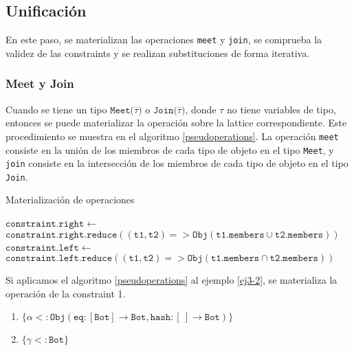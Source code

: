 \subsection{Unificación}
En este paso, se materializan las operaciones \texttt{meet} y \texttt{join}, se comprueba la validez de las constraints y se realizan substituciones de forma iterativa.

\subsubsection{Meet y Join}
Cuando se tiene un tipo $\mathtt{Meet(\overline{\tau}})$ o $\mathtt{Join(\overline{\tau}})$, donde $\tau$ no tiene variables de tipo, entonces se puede materializar la operación sobre la lattice correspondiente. Este procedimiento se muestra en el algoritmo \ref{pseudoperations}. La operación \texttt{meet} consiste en la unión de los miembros de cada tipo de objeto en el tipo \texttt{Meet}, y \texttt{join} consiste en la intersección de los miembros de cada tipo de objeto en el tipo \texttt{Join}.

\begin{algorithm}\captionsetup{labelsep=newline}
  \centering
  \caption{Materialización de operaciones}
  \label{pseudoperations}
    \begin{algorithmic}[1]
              \State $\mathtt{constraint.right\gets}$
              \State \ \ \ \ \ \ \ \ \ $\mathtt{constraint.right.reduce((t1,t2) => Obj(t1.members \cup t2.members))}$
            \EndIf
              \State $\mathtt{constraint.left\gets}$
              \State \ \ \ \ \ \ \ \ \ $\mathtt{constraint.left.reduce((t1,t2) => Obj(t1.members \cap t2.members))}$
            \EndIf
          \EndFor
      \EndFunction
    \end{algorithmic}
\end{algorithm}

Si aplicamos el algoritmo \ref{pseudoperations} al ejemplo \ref{ej3-2}, se materializa la operación de la constraint 1.

\begin{enumerate}
  \item $\mathtt{\{\alpha <: Obj(eq : [Bot] \rightarrow Bot, hash : [\ ] \rightarrow Bot)\}}$
  \item $\mathtt{\{\gamma <: Bot\}}$
\end{enumerate}

